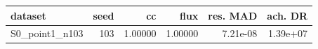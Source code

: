 \begin{tabular}{lrrrrr}
\toprule
dataset & seed & cc & flux & res. MAD & ach. DR \\
\midrule
S0\_point1\_n103 & 103 & 1.00000 & 1.00000 & 7.21e-08 & 1.39e+07 \\
\bottomrule
\end{tabular}